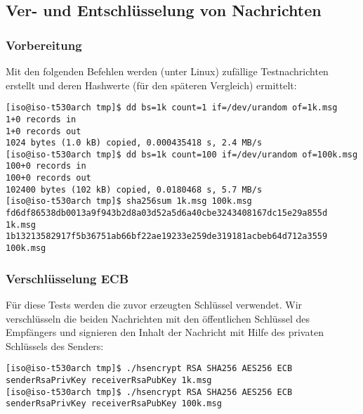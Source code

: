 \subsection{Ver- und Entschlüsselung von Nachrichten}
\subsubsection{Vorbereitung}
Mit den folgenden Befehlen werden (unter Linux) zufällige Testnachrichten erstellt und deren Hashwerte (für den späteren Vergleich) ermittelt:

\begin{lstlisting}
[iso@iso-t530arch tmp]$ dd bs=1k count=1 if=/dev/urandom of=1k.msg
1+0 records in
1+0 records out
1024 bytes (1.0 kB) copied, 0.000435418 s, 2.4 MB/s
[iso@iso-t530arch tmp]$ dd bs=1k count=100 if=/dev/urandom of=100k.msg
100+0 records in
100+0 records out
102400 bytes (102 kB) copied, 0.0180468 s, 5.7 MB/s
[iso@iso-t530arch tmp]$ sha256sum 1k.msg 100k.msg 
fd6df86538db0013a9f943b2d8a03d52a5d6a40cbe3243408167dc15e29a855d  1k.msg
1b13213582917f5b36751ab66bf22ae19233e259de319181acbeb64d712a3559  100k.msg
\end{lstlisting}

\subsubsection{Verschlüsselung ECB}
Für diese Tests werden die zuvor erzeugten Schlüssel verwendet. Wir verschlüsseln die beiden Nachrichten mit den öffentlichen Schlüssel des Empfängers und signieren den Inhalt der Nachricht mit Hilfe des privaten Schlüssels des Senders:

\begin{lstlisting}
[iso@iso-t530arch tmp]$ ./hsencrypt RSA SHA256 AES256 ECB senderRsaPrivKey receiverRsaPubKey 1k.msg 
[iso@iso-t530arch tmp]$ ./hsencrypt RSA SHA256 AES256 ECB senderRsaPrivKey receiverRsaPubKey 100k.msg
\end{lstlisting}

